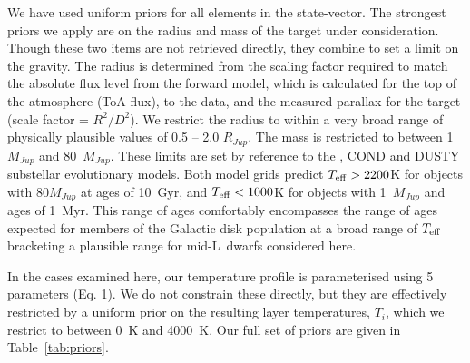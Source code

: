 \documentclass[useAMS,usenatbib]{mn2e}
\begin{document}
We have used uniform priors for all elements in the state-vector. The strongest priors we apply are on the radius and mass of the target under consideration. Though these two items are not retrieved directly, they combine to set a limit on the gravity.  The radius is determined from the scaling factor required to match the absolute flux level from the forward model, which is calculated for the top of the atmosphere (ToA flux), to the data, and the measured parallax for the target (scale factor = $R^{2}/D^{2}$).  We restrict the radius to within a very broad range of physically plausible values of 0.5 -- 2.0 $R_{Jup}$. The mass is restricted to between 1~$M_{Jup}$ and 80~$M_{Jup}$. These limits are set by reference to the \citet{sm08}, COND \citep{baraffe03} and DUSTY \citep{chabrier2000,baraffe2002} substellar evolutionary models. Both model grids predict $T_{\rm eff} > 2200$K for objects with 80$M_{Jup}$ at ages of 10~Gyr, and $T_{\rm eff} < 1000$K for objects with 1~$M_{Jup}$ and ages of 1~Myr. This range of ages comfortably encompasses the range of ages expected for members of the Galactic disk population at a broad range of $T_{\rm eff}$ bracketing a plausible range for mid-L~dwarfs considered here. 

In the cases examined here, our temperature profile is parameterised using 5 parameters (Eq. 1). We do not constrain these directly, but they are effectively restricted by a uniform prior on the resulting layer temperatures, $T_{i}$, which we restrict to between 0~K and 4000~K. Our full set of priors are given in Table~\ref{tab:priors}. 
\end{document}
